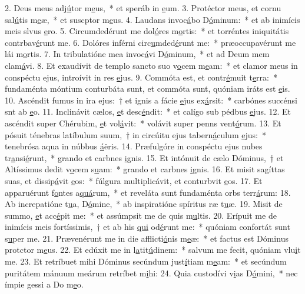 2. Deus meus adj\uline{ú}tor m\uline{e}us,~* et speráb in \uline{e}um.
3. Protéctor meus, et cornu sal\uline{ú}tis m\uline{e}æ,~* et suscptor m\uline{e}us.
4. Laudans invoc\uline{á}bo D\uline{ó}minum:~* et ab inimícis meis slvus \uline{e}ro.
5. Circumdedérunt me dol\uline{ó}res m\uline{o}rtis:~* et torréntes iniquitátis contrbav\uline{é}runt me.
6. Dolóres inférni circ\uline{u}mded\uline{é}runt me:~* præoccupavérunt me lái m\uline{o}rtis.
7. In tribulatióne mea invoc\uline{á}vi D\uline{ó}minum,~* et ad Deum mem clam\uline{á}vi.
8. Et exaudívit de templo sancto suo v\uline{o}cem m\uline{e}am:~* et clamor meus in conspéctu ejus, introívit in res \uline{e}jus.
9. Commóta est, et contr\uline{é}muit t\uline{e}rra:~* fundaménta móntium conturbáta sunt, et commóta sunt, quóniam iráts est \uline{e}is.
10. Ascéndit fumus in ira ejus:~† et ignis a fácie \uline{e}jus ex\uline{á}rsit:~* carbónes succénsi snt ab \uline{e}o.
11. Inclinávit cælos, \uline{e}t desc\uline{é}ndit:~* et calígo sub pédbus \uline{e}jus.
12. Et ascéndit super Chérubim, \uline{e}t vol\uline{á}vit:~* volávit super penns vent\uline{ó}rum.
13. Et pósuit ténebras latíbulum suum,~† in circúitu ejus tabern\uline{á}culum \uline{e}jus:~* tenebrósa aqua in núbbus \uline{á}ëris.
14. Præfulgóre in conspéctu ejus nubes tr\uline{a}nsi\uline{é}runt,~* grando et carbnes \uline{i}gnis.
15. Et intónuit de cælo Dóminus,~† et Altíssimus dedit v\uline{o}cem s\uline{u}am:~* grando et carbnes \uline{i}gnis.
16. Et misit sagíttas suas, et dissip\uline{á}vit \uline{e}os:~* fúlgura multiplicávit, et conturbvit \uline{e}os.
17. Et apparuérunt f\uline{o}ntes a\uline{quá}rum,~* et reveláta sunt fundaménta orbs terr\uline{á}rum:
18. Ab increpatióne t\uline{u}a, D\uline{ó}mine,~* ab inspiratióne spíritus ræ t\uline{u}æ.
19. Misit de summo, \uline{e}t acc\uline{é}pit me:~* et assúmpsit me de quis m\uline{u}ltis.
20. Erípuit me de inimícis meis fortíssimis,~† et ab his \uline{qui} od\uline{é}runt me:~* quóniam confortát sunt s\uline{u}per me.
21. Prævenérunt me in die afflicti\uline{ó}nis m\uline{e}æ:~* et factus est Dóminus protctor m\uline{e}us.
22. Et edúxit me in l\uline{a}tit\uline{ú}dinem:~* salvum me fecit, quóniam vlu\uline{i}t me.
23. Et retríbuet mihi Dóminus secúndum just\uline{í}tiam m\uline{e}am:~* et secúndum puritátem mánuum meárum retríbet m\uline{i}hi:
24. Quia custodívi v\uline{i}as D\uline{ó}mini,~* nec ímpie gessi a Do m\uline{e}o.
